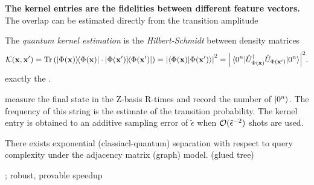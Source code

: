 \textbf{The kernel entries are the fidelities between different feature vectors.}
The overlap can be estimated directly from the transition amplitude 
\begin{definition}\label{def:quantum_kernel}
	The \emph{quantum kernel estimation} is the \emph{Hilbert-Schmidt}  between density matrices
	\begin{equation}
		\kernel(\vbx,\vbx') 
		= \Tr\qty(\dyad{\Phi(\vbx)}\cdot \dyad{\Phi(\vbx')})
		= \abs{\braket{\Phi(\vbx)}{\Phi(\vbx')}}^2 = 
		\abs{\matrixel{0^n}{\U^\dagger_{\Phi(\vbx)} \U_{\Phi(\vbx')}}{0^n}}^2.
	\end{equation}
	exactly the .
\end{definition}
measure the final state in the Z-basis R-times and record the number of $\ket{0^n}$.
The frequency of this string is the estimate of the transition probability.
The kernel entry is obtained to an additive sampling error of $\tilde{\epsilon}$ when $\mathcal{O}(\tilde{\epsilon}^{-2})$ shots are used.

\begin{theorem}
	There exists exponential (classiacl-quantum) separation with respect to query complexity under the adjacency matrix (graph) model. (glued tree)
\end{theorem}
\cite{zhengSpeedingLearningQuantum2022};
robust, provable speedup
\cite{liuRigorousRobustQuantum2021}

